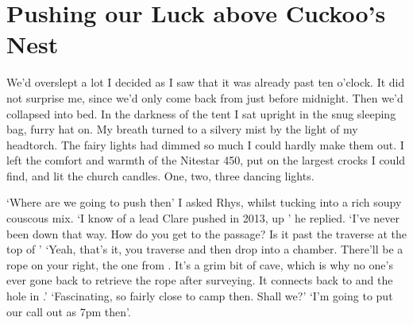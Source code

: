 


\section{Pushing our Luck above Cuckoo's Nest}
    
We'd overslept a lot I decided as I saw that it was already past ten o'clock. It did not surprise me, since we'd only come back from  just before midnight. Then we'd collapsed into bed.
 In the darkness of the tent I sat upright in the snug sleeping bag, furry hat on. My breath turned to a silvery mist by the light of my headtorch. The fairy lights had dimmed so much I could hardly make them out. I left the comfort and warmth of the Nitestar 450, put on the largest crocks I could find, and lit the church candles. One, two, three dancing lights.



`Where are we going to push then' I asked Rhys, whilst tucking into a rich soupy couscous mix.
`I know of a lead Clare pushed in 2013, up ' he replied.
`I've never been down that way. How do you get to the passage? Is it past the traverse at the top of '
`Yeah, that's it, you traverse and then drop into a chamber. There'll be a rope on your right, the one from . It's a grim bit of cave, which is why no one's ever gone back to retrieve the rope after surveying. It connects back to  and the hole in .'
`Fascinating, so fairly close to camp then. Shall we?'
`I'm going to put our call out as 7pm then'.

